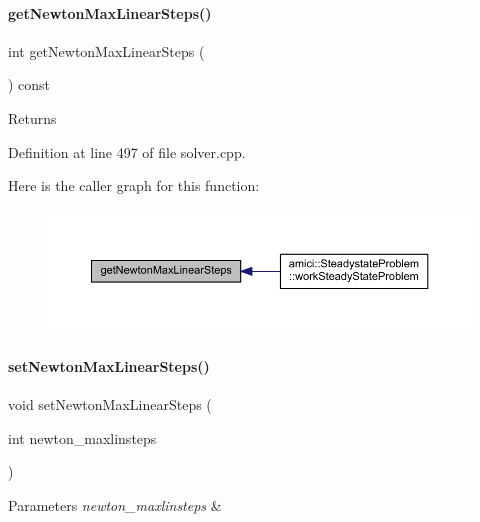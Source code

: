 \paragraph{\texorpdfstring{get\+Newton\+Max\+Linear\+Steps()}{getNewtonMaxLinearSteps()}}
{\footnotesize\ttfamily int get\+Newton\+Max\+Linear\+Steps (\begin{DoxyParamCaption}{ }\end{DoxyParamCaption}) const}

\begin{DoxyReturn}{Returns}

\end{DoxyReturn}


Definition at line 497 of file solver.\+cpp.

Here is the caller graph for this function\+:
\nopagebreak
\begin{figure}[H]
\begin{center}
\leavevmode
\includegraphics[width=350pt]{classamici_1_1_solver_a874c929a78d0e2af11c62ba958e1b3d1_icgraph}
\end{center}
\end{figure}
\mbox{\label{classamici_1_1_solver_af9143ab28630d5db394f641df0a8e477}} 
\paragraph{\texorpdfstring{set\+Newton\+Max\+Linear\+Steps()}{setNewtonMaxLinearSteps()}}
{\footnotesize\ttfamily void set\+Newton\+Max\+Linear\+Steps (\begin{DoxyParamCaption}\item[{int}]{newton\+\_\+maxlinsteps }\end{DoxyParamCaption})}


\begin{DoxyParams}{Parameters}
{\em newton\+\_\+maxlinsteps} & \\
\hline
\end{DoxyParams}


